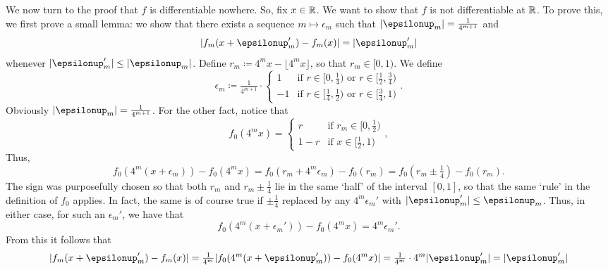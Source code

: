 \begin{exm}
We now turn to the proof that $f$ is differentiable nowhere.  So, fix $x\in \mathbb{R}$.  We want to show that $f$ is not differentiable at $\mathbb{R}$.  To prove this, we first prove a small lemma:  we show that there exists a sequence $m\mapsto \epsilon _m$ such that $\abs{\epsilon _m}=\frac{1}{4^{m+1}}$ and
\begin{equation}
\abs{f_m(x+\epsilon _m')-f_m(x)}=\abs{\epsilon _m'}
\end{equation}
whenever $\abs{\epsilon _m'}\leq \abs{\epsilon _m}$.  Define $r_m\coloneqq 4^mx-\lfloor 4^mx\rfloor$, so that $r_m\in [0,1)$.  We define
\begin{equation}
\epsilon _m\coloneqq \tfrac{1}{4^{m+1}}\cdot \begin{cases}1 & \text{if }r\in [0,\tfrac{1}{4})\text{ or }r\in [\tfrac{1}{2},\tfrac{3}{4}) \\ -1 & \text{if }r\in [\tfrac{1}{4},\tfrac{1}{2})\text{ or }r\in [\tfrac{3}{4},1)\end{cases}.
\end{equation}
Obviously $\abs{\epsilon _m}=\frac{1}{4^{m+1}}$.  For the other fact, notice that
\begin{equation}
f_0(4^mx)=\begin{cases}r & \text{if }r_m\in [0,\tfrac{1}{2}) \\ 1-r & \text{if }x\in [\tfrac{1}{2},1)\end{cases},
\end{equation}
Thus,
\begin{equation}
f_0(4^m(x+\epsilon _m))-f_0(4^mx)=f_0(r_m+4^m\epsilon _m)-f_0(r_m)=f_0(r_m\pm \tfrac{1}{4})-f_0(r_m).
\end{equation}
The sign was purposefully chosen so that both $r_m$ and $r_m\pm \frac{1}{4}$ lie in the same `half' of the interval $[0,1]$, so that the same `rule' in the definition of $f_0$ applies.  In fact, the same is of course true if $\pm \tfrac{1}{4}$ replaced by any $4^m\epsilon _m'$ with $\abs{\epsilon _m'}\leq \epsilon _m$.  Thus, in either case, for such an $\epsilon _m'$, we have that
\begin{equation}
f_0(4^m(x+\epsilon _m'))-f_0(4^mx)=4^m\epsilon _m'.
\end{equation}
From this it follows that
\begin{equation}
\abs{f_m(x+\epsilon _m')-f_m(x)}=\tfrac{1}{4^m}\abs{f_0(4^m(x+\epsilon _m'))-f_0(4^mx)}=\tfrac{1}{4^m}\cdot 4^m\abs{\epsilon _m'}=\abs{\epsilon _m'}
\end{equation}


\end{exm}
